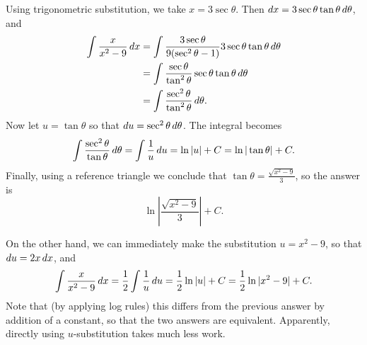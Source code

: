 \documentclass[]{ximera}
\begin{document}
\begin{freeResponse}
Using trigonometric substitution, we take $x = 3 \sec \theta$. Then $\mathop{}\!d x = 3 \sec \theta \tan \theta \mathop{}\!d \theta$, and 
\begin{align*}
\int \frac{x}{x^2-9} \mathop{}\!d x &= \int \frac{3 \sec \theta}{9(\sec^2 \theta - 1)} 3 \sec \theta \tan \theta \mathop{}\!d \theta \\
&= \int \frac{\sec \theta}{\tan^2 \theta} \sec \theta \tan \theta \mathop{}\!d \theta \\
&= \int \frac{\sec^2 \theta}{\tan^2 \theta} \mathop{}\!d \theta.
\end{align*}
Now let $u = \tan \theta$ so that $\mathop{}\!d u = \sec^2 \theta \mathop{}\!d \theta$. The integral becomes
$$
\int \frac{\sec^2 \theta}{\tan \theta} \mathop{}\!d \theta = \int \frac{1}{u} \mathop{}\!d u = \ln |u| + C = \ln | \tan \theta | + C.
$$
Finally, using a reference triangle we conclude that $\tan \theta = \frac{\sqrt{x^2-9}}{3}$, so the answer is 
$$
\ln \left| \frac{\sqrt{x^2-9}}{3}\right| + C.
$$

On the other hand, we can immediately make the substitution $u = x^2 - 9$, so that $\mathop{}\!d u = 2x \mathop{}\!d x$, and 
$$
\int \frac{x}{x^2-9} \mathop{}\!d x = \frac{1}{2} \int \frac{1}{u} \mathop{}\!d u = \frac{1}{2} \ln |u| + C = \frac{1}{2} \ln |x^2-9| + C.
$$
Note that (by applying log rules) this differs from the previous answer by addition of a constant, so that the two answers are equivalent. Apparently, directly using $u$-substitution takes much less work. 
\end{freeResponse}
\end{document}
